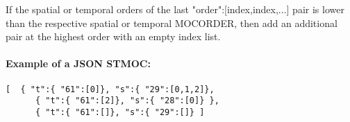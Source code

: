 If the spatial or temporal orders of the last "order":[index,index,...] pair is lower than the respective spatial or temporal MOCORDER, then add an additional pair at the highest order with an empty index list.

\paragraph{Example of a JSON STMOC:}
\par\noindent
\begin{Verbatim}[frame=single]
   [  { "t":{ "61":[0]}, "s":{ "29":[0,1,2]},
      { "t":{ "61":[2]}, "s":{ "28":[0]} },
      { "t":{ "61":[]}, "s":{ "29":[]} ]
\end{Verbatim}

